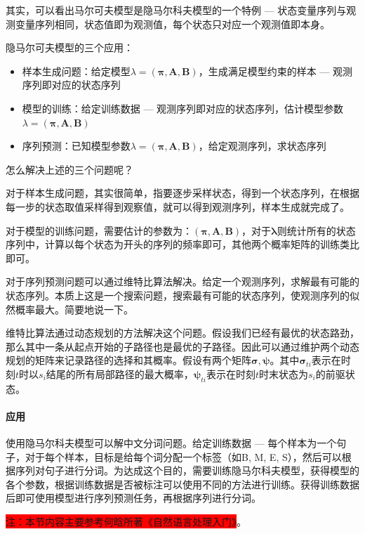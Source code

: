 其实，可以看出马尔可夫模型是隐马尔科夫模型的一个特例 --- 状态变量序列与观测变量序列相同，状态值即为观测值，每个状态只对应一个观测值即本身。

隐马尔可夫模型的三个应用：
\begin{itemize}
	\item 样本生成问题：给定模型$\lambda = (\boldsymbol{\pi}, \boldsymbol{A}, \boldsymbol{B})$，生成满足模型约束的样本 --- 观测序列即对应的状态序列
	\item 模型的训练：给定训练数据 --- 观测序列即对应的状态序列，估计模型参数$\lambda = (\boldsymbol{\pi}, \boldsymbol{A}, \boldsymbol{B})$
	\item 序列预测：已知模型参数$\lambda = (\boldsymbol{\pi}, \boldsymbol{A}, \boldsymbol{B})$，给定观测序列，求状态序列
\end{itemize}

怎么解决上述的三个问题呢？

对于样本生成问题，其实很简单，指要逐步采样状态，得到一个状态序列，在根据每一步的状态取值采样得到观察值，就可以得到观测序列，样本生成就完成了。

对于模型的训练问题，需要估计的参数为：$(\boldsymbol{\pi}, \boldsymbol{A}, \boldsymbol{B})$，对于$\boldsymbol{\lambda}$则统计所有的状态序列中，计算以每个状态为开头的序列的频率即可，其他两个概率矩阵的训练类比即可。

对于序列预测问题可以通过维特比算法解决。给定一个观测序列，求解最有可能的状态序列。本质上这是一个搜索问题，搜索最有可能的状态序列，使观测序列的似然概率最大。简要地说一下。

维特比算法通过动态规划的方法解决这个问题。假设我们已经有最优的状态路劲，那么其中一条从起点开始的子路径也是最优的子路径。因此可以通过维护两个动态规划的矩阵来记录路径的选择和其概率。假设有两个矩阵$\boldsymbol{\sigma}, \boldsymbol{\psi}$。其中$\boldsymbol{\sigma}_{ti}$表示在时刻$t$时以$s_i$结尾的所有局部路径的最大概率，$\boldsymbol{\psi}_{ti}$表示在时刻$t$时末状态为$s_i$的前驱状态。

\paragraph{应用}使用隐马尔科夫模型可以解中文分词问题。给定训练数据 --- 每个样本为一个句子，对于每个样本，目标是给每个词分配一个标签（如{B, M, E, S}），然后可以根据序列对句子进行分词。为达成这个目的，需要训练隐马尔科夫模型，获得模型的各个参数，根据训练数据是否被标注可以使用不同的方法进行训练。获得训练数据后即可使用模型进行序列预测任务，再根据序列进行分词。


\colorbox{red}{注：本节内容主要参考何晗所著《自然语言处理入门》}。


